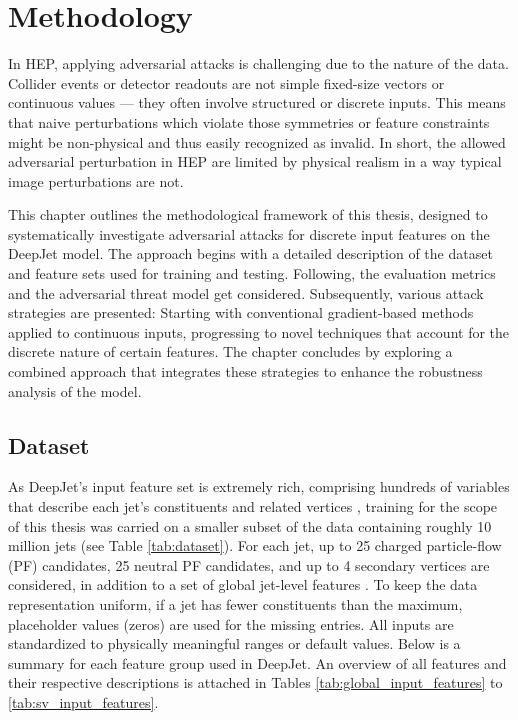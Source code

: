 
\chapter{Methodology}

In HEP, applying adversarial attacks is challenging due to the nature of the data. Collider events or detector readouts are not simple fixed-size vectors or continuous values — they often involve structured or discrete inputs. This means that naive perturbations which violate those symmetries or feature constraints might be non-physical and thus easily recognized as invalid. In short, the allowed adversarial perturbation in HEP are limited by physical realism in a way typical image perturbations are not.

This chapter outlines the methodological framework of this thesis, designed to systematically investigate adversarial attacks for discrete input features on the DeepJet model. The approach begins with a detailed description of the dataset and feature sets used for training and testing. Following, the evaluation metrics and the adversarial threat model get considered. Subsequently, various attack strategies are presented: Starting with conventional gradient-based methods applied to continuous inputs, progressing to novel techniques that account for the discrete nature of certain features. The chapter concludes by exploring a combined approach that integrates these strategies to enhance the robustness analysis of the model.


\section{Dataset}
\label{sec:dataset}

As DeepJet’s input feature set is extremely rich, comprising hundreds of variables that describe each jet’s constituents and related vertices \cite{Bols_2020}, training for the scope of this thesis was carried on a smaller subset of the data containing roughly 10 million jets (see Table \ref{tab:dataset}). For each jet, up to 25 charged particle-flow (PF) candidates, 25 neutral PF candidates, and up to 4 secondary vertices are considered, in addition to a set of global jet-level features \cite{Bols_2020}. To keep the data representation uniform, if a jet has fewer constituents than the maximum, placeholder values (zeros) are used for the missing entries. All inputs are standardized to physically meaningful ranges or default values. Below is a
summary for each feature group used in DeepJet. An overview of all features and their respective descriptions is attached in Tables \ref{tab:global_input_features} to \ref{tab:sv_input_features}.




